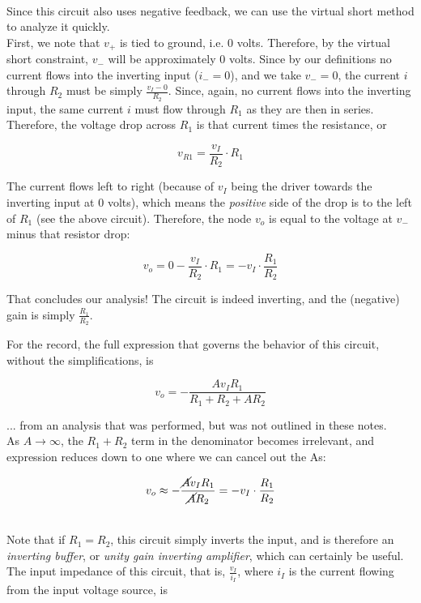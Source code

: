 \ \\
Since this circuit also uses negative feedback, we can use the virtual short method to analyze it quickly.\\
First, we note that $v_+$ is tied to ground, i.e. 0 volts. Therefore, by the virtual short constraint, $v_-$ will be approximately 0 volts. Since by our definitions no current flows into the inverting input ($i_- = 0$), and we take $v_- = 0$, the current $i$ through $R_2$ must be simply $\displaystyle \frac{v_I - 0}{R_2}$. Since, again, no current flows into the inverting input, the same current $i$ must flow through $R_1$ as they are then in series.\\ Therefore, the voltage drop across $R_1$ is that current times the resistance, or

\[ v_{R1} = \frac{v_I}{R_2} \cdot R_1 \] 

The current flows left to right (because of $v_I$ being the driver towards the inverting input at 0 volts), which means the \emph{positive} side of the drop is to the left of $R_1$ (see the above circuit). Therefore, the node $v_o$ is equal to the voltage at $v_-$ minus that resistor drop:

\[ v_o = 0 - \frac{v_I}{R_2} \cdot R_1 = -v_I \cdot \frac{R_1}{R_2} \]

That concludes our analysis! The circuit is indeed inverting, and the (negative) gain is simply $\displaystyle \frac{R_1}{R_2}$.

For the record, the full expression that governs the behavior of this circuit, without the simplifications, is

\[ v_o = -\frac{A v_I R_1}{R_1 + R_2 + A R_2} \]

... from an analysis that was performed, but was not outlined in these notes.\\
As $A \to \infty$, the $R_1 + R_2$ term in the denominator becomes irrelevant, and expression reduces down to one where we can cancel out the As:

\[ v_o \approx -\frac{\cancel{A} v_I R_1}{\cancel{A} R_2} = -v_I \cdot \frac{R_1}{R_2} \]

\ \\
Note that if $R_1 = R_2$, this circuit simply inverts the input, and is therefore an \emph{inverting buffer}, or \emph{unity gain inverting amplifier}, which can certainly be useful.\\

The input impedance of this circuit, that is, $\displaystyle \frac{v_I}{i_I}$, where $i_I$ is the current flowing from the input voltage source, is

